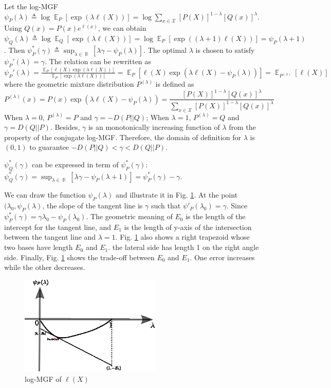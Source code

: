 \documentclass{article}
\DeclareMathOperator{\E}{\mathbb{E}}
\DeclareMathOperator{\R}{\mathbb{R}}
\begin{document}
Let the log-MGF $\psi_P(\lambda)\triangleq \log \E_{P}
[\exp(\lambda \ell(X))] = \log \sum_{x\in\mathcal{X}}
[P(X)]^{1-\lambda}[Q(x)]^{\lambda}$.
Using $Q(x)=P(x)e^{\ell(x)}$, we can obtain
$\psi_Q(\lambda)\triangleq \log \E_{Q}
[\exp(\lambda \ell(X))] = \log \E_{P}
[\exp((\lambda +1)\ell(X))] = \psi_P(\lambda + 1)$.
Then
$\psi_P^*(\gamma)\triangleq \sup_{\lambda \in \R} [\lambda \gamma - \psi_P(\lambda)]$.
The optimal $\lambda$ is chosen to satisfy
$\psi_P'(\lambda) = \gamma$.
The relation can be rewritten as
$\psi_P'(\lambda) = \frac{\E_{P}
[\ell(X)\exp(\lambda \ell(X))]}{\E_{P}
[\exp(\lambda \ell(X))]}
=\E_{P}
[\ell(X)\exp(\lambda \ell(X)-\psi_P(\lambda))]
=\E_{P^{(\lambda)}}[\ell(X)]$ where the geometric mixture distribution
$P^{(\lambda)}$ is defined as 
\begin{equation}\label{eq:plambda}
    P^{(\lambda)}(x) = P(x)\exp(\lambda \ell(X)-\psi_P(\lambda))
    = \frac{
[P(X)]^{1-\lambda}[Q(x)]^{\lambda}
}{\sum_{x\in\mathcal{X}}
[P(X)]^{1-\lambda}[Q(x)]^{\lambda}}
\end{equation}
When $\lambda = 0$, $P^{(\lambda)} = P$ and $\gamma = -D(P||Q)$;
When $\lambda = 1$, $P^{(\lambda)} = Q$ and $\gamma = D(Q||P)$.
Besides, $\gamma$ is an monotonically increasing function of
$\lambda$ from the property of the conjugate log-MGF.
Therefore, the domain of definition for $\lambda$ is $(0,1)$ to guarantee $-D(P||Q) < \gamma < D(Q||P)$.

$\psi_Q^*(\gamma)$ can be expressed in term of
$\psi_P^*(\gamma)$:
$\psi_Q^*(\gamma)
=\sup_{\lambda \in \R} [\lambda \gamma - \psi_P(\lambda+1)]
=\psi_P^*(\gamma)-\gamma
$.

We can draw the function $\psi_P(\lambda)$ and illustrate it
in Fig. \ref{fig:psiell}. At the point $(\lambda_0, \psi_P(\lambda)$,
the slope of the tangent line is $\gamma$ such that
$\psi'_P(\lambda_0)=\gamma$. Since $\psi_P^*(\gamma) = \gamma \lambda_0 - \psi_P(\lambda_0)$. The geometric meaning of $E_0$ is the length
of the intercept for the tangent line, and $E_1$ is the length of
y-axis of the intersection between the tangent line and $\lambda=1$.
Fig. \ref{fig:psiell} also shows a right trapezoid whose
two bases have length $E_0$ and $E_1$. the lateral side
has length 1 on the right angle side. Finally, Fig.
\ref{fig:psiell} shows the trade-off between $E_0$ and $E_1$.
One error increases while the other decreases.
\begin{figure}[!ht]
    \centering
    \includegraphics[width=0.6\textwidth]{e0e1.eps}
    \caption{log-MGF of $\ell(X)$}
    \label{fig:psiell}
\end{figure}
\end{document}
